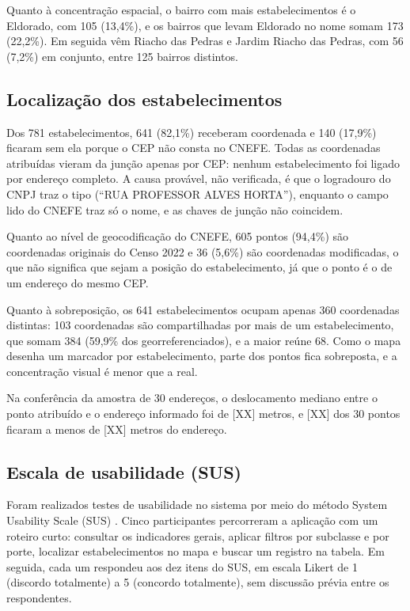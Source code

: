Quanto à concentração espacial, o bairro com mais estabelecimentos é o Eldorado, com 105 (13,4\%), e os bairros que levam Eldorado no nome somam 173 (22,2\%).
Em seguida vêm Riacho das Pedras e Jardim Riacho das Pedras, com 56 (7,2\%) em conjunto, entre 125 bairros distintos.

\subsection{Localização dos estabelecimentos}

Dos 781 estabelecimentos, 641 (82,1\%) receberam coordenada e 140 (17,9\%) ficaram sem ela porque o CEP não consta no CNEFE.
Todas as coordenadas atribuídas vieram da junção apenas por CEP: nenhum estabelecimento foi ligado por endereço completo.
A causa provável, não verificada, é que o logradouro do CNPJ traz o tipo (``RUA PROFESSOR ALVES HORTA''), enquanto o campo lido do CNEFE traz só o nome, e as chaves de junção não coincidem.

Quanto ao nível de geocodificação do CNEFE, 605 pontos (94,4\%) são coordenadas originais do Censo 2022 e 36 (5,6\%) são coordenadas modificadas, o que não significa que sejam a posição do estabelecimento, já que o ponto é o de um endereço do mesmo CEP.

Quanto à sobreposição, os 641 estabelecimentos ocupam apenas 360 coordenadas distintas: 103 coordenadas são compartilhadas por mais de um estabelecimento, que somam 384 (59,9\% dos georreferenciados), e a maior reúne 68.
Como o mapa desenha um marcador por estabelecimento, parte dos pontos fica sobreposta, e a concentração visual é menor que a real.

Na conferência da amostra de 30 endereços, o deslocamento mediano entre o ponto atribuído e o endereço informado foi de [XX] metros, e [XX] dos 30 pontos ficaram a menos de [XX] metros do endereço.

\subsection{Escala de usabilidade (SUS)}
\label{subsec:testes}

Foram realizados testes de usabilidade no sistema por meio do método System Usability Scale (SUS) \cite{brooke1996}.
Cinco participantes percorreram a aplicação com um roteiro curto: consultar os indicadores gerais, aplicar filtros por subclasse e por porte, localizar estabelecimentos no mapa e buscar um registro na tabela.
Em seguida, cada um respondeu aos dez itens do SUS, em escala Likert de 1 (discordo totalmente) a 5 (concordo totalmente), sem discussão prévia entre os respondentes.

